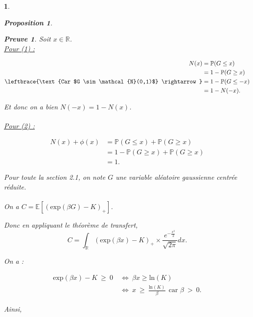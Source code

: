 \documentclass{article}
\theoremstyle{exostyle}
\newtheorem{exercice}{}
\newenvironment{questions}{
\begin{enumerate}[\hspace{12pt} 1.]}{\end{enumerate}}
\newtheorem*{prop}{Proposition}
\newtheorem*{preuve}{Preuve}
\begin{document}
\begin{exercice}
\begin{questions}
\begin{prop}
\end{prop}

\bigbreak

\begin{preuve} Soit $x \in \mathbb{R}$.\\

\underline{Pour (1) :} 

\begin{align*}
    N(x) &= \mathbb{P}(G \leq x)\\
    &= 1-\mathbb{P}(G \geq x)\\
    \leftbrace{\text{Car $G \sim \mathcal{N}(0,1)$} \rightarrow}&= 1-\mathbb{P}(G \leq -x)\\
    &= 1-N(-x).
\end{align*}   

Et donc on a bien $N(-x) = 1-N(x)$.\\
\\
\underline{Pour (2) :}

\begin{align*}
    N(x) + \phi(x) &= \mathbb{P}(G \leq x) + \mathbb{P}(G \geq x)\\
    &= 1 - \mathbb{P}(G \geq x) + \mathbb{P}(G \geq x)\\
    &= 1.
\end{align*} \hspace{15.75cm} \qedsymbol
\end{preuve}


\bigbreak
\bigbreak
\bigbreak

Pour toute la section 2.1, on note $G$ une variable aléatoire gaussienne centrée réduite.\\

\\

On a $C = \mathbb{E}[(\text{exp}(\beta G)-K)_{+}]$.

\bigbreak

Donc en appliquant le théorème de transfert,
\[C = \int_{\mathbb{R}} (\text{exp}(\beta x) - K)_{+} \times \frac{e^{-\frac{x^{2}}{2}}}{\sqrt{2\pi}}dx.\]

On a :

\begin{align*}
    \text{exp}(\beta x)-K \ \geq \ 0 \ &\Leftrightarrow \  \beta x \geq \text{ln}(K)\\
    &\Leftrightarrow \ x \ \geq \ \frac{\text{ln}(K)}{\beta} \ \ \text{car $\beta \ > \ 0$.}
\end{align*}

Ainsi, 


\end{questions}
\end{exercice}
\end{document}
